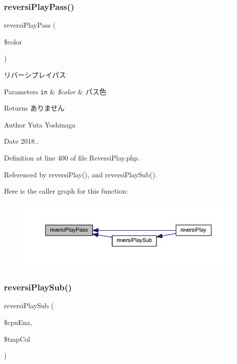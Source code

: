 \subsubsection{\texorpdfstring{reversi\+Play\+Pass()}{reversiPlayPass()}}
{\footnotesize\ttfamily reversi\+Play\+Pass (\begin{DoxyParamCaption}\item[{}]{\$color }\end{DoxyParamCaption})}



リバーシプレイパス 


\begin{DoxyParams}[1]{Parameters}
\mbox{\tt in}  & {\em \$color} & パス色 \\
\hline
\end{DoxyParams}
\begin{DoxyReturn}{Returns}
ありません 
\end{DoxyReturn}
\begin{DoxyAuthor}{Author}
Yuta Yoshinaga 
\end{DoxyAuthor}
\begin{DoxyDate}{Date}
2018.. 
\end{DoxyDate}


Definition at line 400 of file Reversi\+Play.\+php.



Referenced by reversi\+Play(), and reversi\+Play\+Sub().

Here is the caller graph for this function\+:
\nopagebreak
\begin{figure}[H]
\begin{center}
\leavevmode
\includegraphics[width=350pt]{class_reversi_play_a67816fe65a87e35d8e8cc35d5d269bcb_icgraph}
\end{center}
\end{figure}
\mbox{\label{class_reversi_play_a990fc6e45b7bdf2dab569f087f8b5a62}} 
\subsubsection{\texorpdfstring{reversi\+Play\+Sub()}{reversiPlaySub()}}
{\footnotesize\ttfamily reversi\+Play\+Sub (\begin{DoxyParamCaption}\item[{}]{\$cpu\+Ena,  }\item[{}]{\$tmp\+Col }\end{DoxyParamCaption})}




